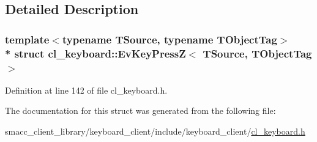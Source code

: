 \subsection{Detailed Description}
\subsubsection*{template$<$typename T\+Source, typename T\+Object\+Tag$>$\\*
struct cl\+\_\+keyboard\+::\+Ev\+Key\+Press\+Z$<$ T\+Source, T\+Object\+Tag $>$}



Definition at line 142 of file cl\+\_\+keyboard.\+h.



The documentation for this struct was generated from the following file\+:\begin{DoxyCompactItemize}
\item 
smacc\+\_\+client\+\_\+library/keyboard\+\_\+client/include/keyboard\+\_\+client/\hyperlink{cl__keyboard_8h}{cl\+\_\+keyboard.\+h}\end{DoxyCompactItemize}
